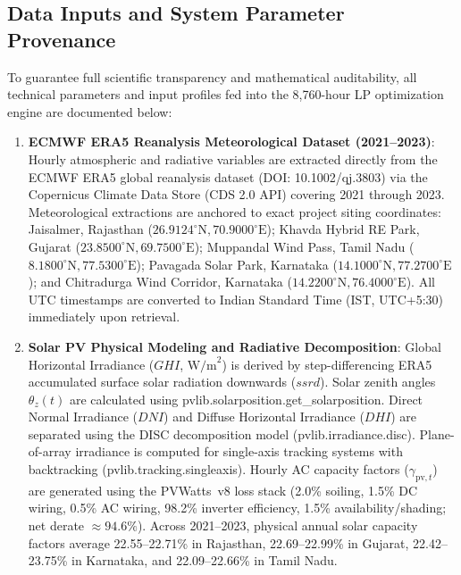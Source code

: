 \documentclass[11pt,a4paper]{article}
\begin{document}
\subsection{Data Inputs and System Parameter Provenance}
\label{sec:data_inputs}

To guarantee full scientific transparency and mathematical auditability, all technical parameters and input profiles fed into the 8,760-hour LP optimization engine are documented below:

\begin{enumerate}
    \item \textbf{ECMWF ERA5 Reanalysis Meteorological Dataset (2021--2023)}: Hourly atmospheric and radiative variables are extracted directly from the ECMWF ERA5 global reanalysis dataset (\textsf{DOI: 10.1002/qj.3803}) via the Copernicus Climate Data Store (CDS 2.0 API) covering 2021 through 2023. Meteorological extractions are anchored to exact project siting coordinates: Jaisalmer, Rajasthan ($26.9124^\circ\text{N}, 70.9000^\circ\text{E}$); Khavda Hybrid RE Park, Gujarat ($23.8500^\circ\text{N}, 69.7500^\circ\text{E}$); Muppandal Wind Pass, Tamil Nadu ($8.1800^\circ\text{N}, 77.5300^\circ\text{E}$); Pavagada Solar Park, Karnataka ($14.1000^\circ\text{N}, 77.2700^\circ\text{E}$); and Chitradurga Wind Corridor, Karnataka ($14.2200^\circ\text{N}, 76.4000^\circ\text{E}$). All UTC timestamps are converted to Indian Standard Time (IST, UTC+5:30) immediately upon retrieval.

    \item \textbf{Solar PV Physical Modeling and Radiative Decomposition}: Global Horizontal Irradiance ($GHI$, $\text{W/m}^2$) is derived by step-differencing ERA5 accumulated surface solar radiation downwards ($ssrd$). Solar zenith angles $\theta_z(t)$ are calculated using \textsf{pvlib.solarposition.get\_solarposition}. Direct Normal Irradiance ($DNI$) and Diffuse Horizontal Irradiance ($DHI$) are separated using the DISC decomposition model (\textsf{pvlib.irradiance.disc}). Plane-of-array irradiance is computed for single-axis tracking systems with backtracking (\textsf{pvlib.tracking.singleaxis}). Hourly AC capacity factors ($\gamma_{\text{pv},t}$) are generated using the PVWatts~v8 loss stack (2.0\% soiling, 1.5\% DC wiring, 0.5\% AC wiring, 98.2\% inverter efficiency, 1.5\% availability/shading; net derate $\approx 94.6\%$). Across 2021--2023, physical annual solar capacity factors average 22.55--22.71\% in Rajasthan, 22.69--22.99\% in Gujarat, 22.42--23.75\% in Karnataka, and 22.09--22.66\% in Tamil Nadu.


\end{enumerate}
\end{document}
